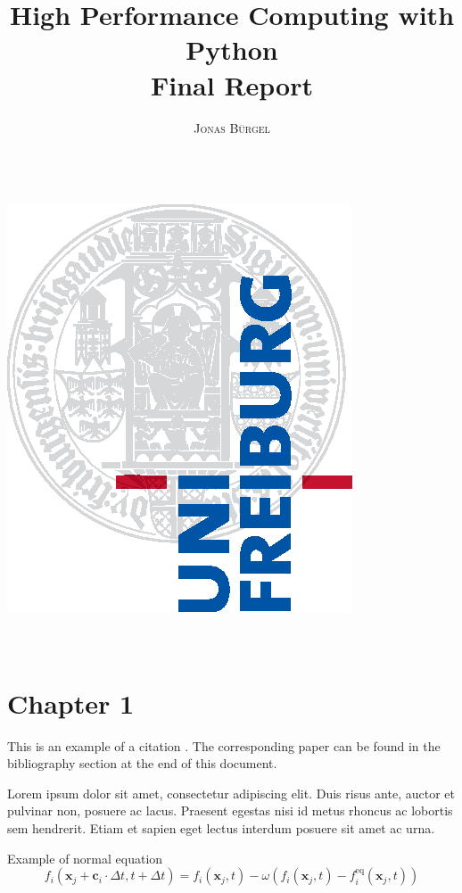 \documentclass[a4paper,11pt]{report}
\title{\Huge \textbf{High Performance Computing with Python} \vspace{4mm} \\ \huge Final Report}
\author{\textsc{Jonas Bürgel} \\ \vspace{3mm}\text{5500163}  \\
\vspace{3mm}\text{jonas.buergel@mail.de}}
\begin{document}
    \makeatletter
    \begin{titlepage}
        \begin{center}
            \includegraphics[width=0.5\linewidth]{logos/Uni_Logo-Grundversion_E1_A4_CMYK.eps}\\[4ex]
            {\huge \bfseries  \@title }\\[2ex]
            {\LARGE  \@author}\\[30ex]
            {\large \@date}
        \end{center}
    \end{titlepage}
    \makeatother
    \thispagestyle{empty}
    \newpage



    \tableofcontents


    
    
    
    
    


    \chapter{Chapter 1}

    This is an example of a citation \cite{timm2016lattice}.
    The corresponding paper can be found in the bibliography section at the end of this document.

    Lorem ipsum dolor sit amet, consectetur adipiscing elit.
    Duis risus ante, auctor et pulvinar non, posuere ac lacus. Praesent egestas nisi id metus rhoncus ac lobortis sem hendrerit. Etiam et sapien eget lectus interdum posuere sit amet ac urna.

    Example of normal equation
    \begin{equation}
        \label{eq:LBE}
        f_i(\mathbf{x}_j+\mathbf{c}_i\cdot\Delta t,t+\Delta t)=f_i(\mathbf{x}_j,t)
        -\omega \left( f_i(\mathbf{x}_j,t)-f_i^\text{eq}(\mathbf{x}_j,t) \right)
    \end{equation}
\end{document}
